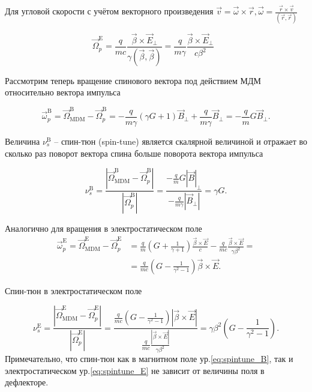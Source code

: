 \noindent Для угловой скорости с учётом векторного произведения $\vec{v}=\vec{\omega}\times\vec{r}, \vec{\omega}=\frac{\vec{r}\times\vec{v}}{(\vec{r},\vec{r})}$

\begin{equation}
{\vec{\Omega}}_p^{\textrm{E}}=\frac{q}{mc}\frac{\vec{\beta}\times{\vec{E}}_\bot}{\gamma(\vec{\beta},\vec{\beta})}=\frac{q}{m\gamma}\frac{\vec{\beta}\times{\vec{E}}_\bot}{c\beta^2}\ \ \ 
\end{equation}

\par Рассмотрим теперь вращение спинового вектора под действием МДМ относительно вектора импульса

\begin{equation}
{\vec{\omega}}_p^{\textrm{B}}={\vec{\Omega}}_{\textrm{MDM}}^\textrm{B}-{\vec{\Omega}}_p^{\textrm{B}}=-\frac{q}{m\gamma}\left(\gamma G+1\right){\vec{B}}_\bot+\frac{q}{m\gamma}{\vec{B}}_\bot=-\frac{q}{m}{G\vec{B}}_\bot.
\end{equation}

\noindent Величина $\nu_s^{\textrm{B}}$ -- спин-тюн (spin-tune) является скалярной величиной и отражает во сколько раз поворот вектора спина больше поворота вектора импульса

\begin{equation} \label{eq:spintune_B}
\nu_s^{\textrm{B}}=\frac{\left|{\vec{\Omega}}_{\textrm{MDM}}^{\textrm{B}}-{\vec{\Omega}}_p^{\textrm{B}}\right|}{\left|{\vec{\Omega}}_p^{\textrm{B}}\right|}=\frac{-\frac{q}{m}{G\left|\vec{B}\right|}_\bot}{-\frac{q}{m\gamma}\left|{\vec{B}}_\bot\right|}=\gamma G.
\end{equation}

\noindent Аналогично для вращения в электростатическом поле
\begin{equation}
\begin{aligned}
{\vec{\omega}}_p^{\textrm{E}}={\vec{\Omega}}_{\textrm{MDM}}^{\textrm{E}}-{\vec{\Omega}}_p^{\textrm{E}}&=\frac{q}{m}\left(G+\frac{1}{\gamma+1}\right)\frac{\vec{\beta}\times\vec{E}}{c}-\frac{q}{mc}\frac{\vec{\beta}\times\vec{E}}{\gamma\beta^2} =\\
&=\frac{q}{mc}\left(G-\frac{1}{\gamma^2-1}\right)\vec{\beta}\times\vec{E}.
\end{aligned}
\end{equation}

\noindent Спин-тюн в электростатическом поле

\begin{equation} \label{eq:spintune_E}
\nu_s^{\textrm{E}}=\frac{\left|{\vec{\Omega}}_{\textrm{MDM}}^{\textrm{E}}-{\vec{\Omega}}_p^{\textrm{E}}\right|}{\left|{\vec{\Omega}}_p^{\textrm{E}}\right|}=\frac{\frac{q}{mc}\left(G-\frac{1}{\gamma^2-1}\right)\left|\vec{\beta}\times\vec{E}\right|}{\frac{q}{mc}\frac{\left|\vec{\beta}\times\vec{E}\right|}{\gamma\beta^2}}=\gamma\beta^2\left(G-\frac{1}{\gamma^2-1}\right).
\end{equation}
Примечательно, что спин-тюн как в магнитном поле ур.\ref{eq:spintune_B}, так и  электростатическом ур.\ref{eq:spintune_E} не зависит от величины поля в дефлекторе.

